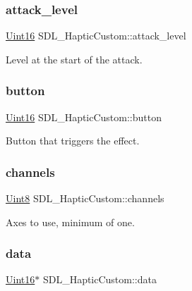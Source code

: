 \subsubsection{\texorpdfstring{attack\+\_\+level}{attack\_level}}
{\footnotesize\ttfamily \hyperlink{_s_d_l__stdinc_8h_a31fcc0a076c9068668173ee26d33e42b}{Uint16} S\+D\+L\+\_\+\+Haptic\+Custom\+::attack\+\_\+level}

Level at the start of the attack. \mbox{\label{struct_s_d_l___haptic_custom_aa4fbaf7220f3197aa6631b3e64ad6562}} 
\subsubsection{\texorpdfstring{button}{button}}
{\footnotesize\ttfamily \hyperlink{_s_d_l__stdinc_8h_a31fcc0a076c9068668173ee26d33e42b}{Uint16} S\+D\+L\+\_\+\+Haptic\+Custom\+::button}

Button that triggers the effect. \mbox{\label{struct_s_d_l___haptic_custom_a560215762e9096d583d75867d9227cf5}} 
\subsubsection{\texorpdfstring{channels}{channels}}
{\footnotesize\ttfamily \hyperlink{_s_d_l__stdinc_8h_a2944638813a090aa23e62f4da842c3e2}{Uint8} S\+D\+L\+\_\+\+Haptic\+Custom\+::channels}

Axes to use, minimum of one. \mbox{\label{struct_s_d_l___haptic_custom_ad5a034f97e1699eacbe3f478538537c5}} 
\subsubsection{\texorpdfstring{data}{data}}
{\footnotesize\ttfamily \hyperlink{_s_d_l__stdinc_8h_a31fcc0a076c9068668173ee26d33e42b}{Uint16}$\ast$ S\+D\+L\+\_\+\+Haptic\+Custom\+::data}

